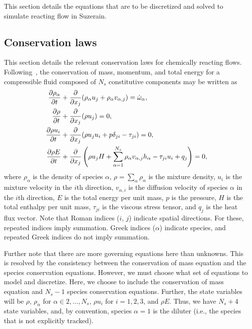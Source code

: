 This section details the equations that are to be discretized and
solved to simulate reacting flow in Suzerain.

\subsection{Conservation laws}
This section details the relevant conservation laws for chemically
reacting flows.  Following~\cite{Anderson_hypersonics,
  Kirk_2009_FINS_model_doc}, the conservation of mass, momentum, and
total energy for a compressible fluid composed of $N_s$ constitutive
components may be written as
%
\begin{align*}
  \frac{\partial \rho_{\alpha}}{\partial t} & + \frac{\partial }{\partial x_j} (\rho_{\alpha} u_j + \rho_{\alpha} v_{\alpha, j}) = \dot{\omega}_{\alpha}, \\
  \frac{\partial \rho}{\partial t} & + \frac{\partial }{\partial x_j} (\rho u_j) = 0, \\
  \frac{\partial \rho u_i}{\partial t} & + \frac{\partial }{\partial x_j} (\rho u_j u_i + p \delta_{ji} - \tau_{ji}) = 0, \\
  \frac{\partial \rho E}{\partial t} & + \frac{\partial }{\partial x_j} \left(\rho u_j H + \sum_{\alpha=1}^{N_s} \rho_{\alpha} v_{\alpha, j} h_{\alpha}  - \tau_{ji} u_i + q_j \right) = 0,\\
\end{align*}
% 
where $\rho_{\alpha}$ is the density of species $\alpha$, $\rho=\sum_{\alpha} \rho_{\alpha}$
is the mixture density, $u_i$ is the mixture velocity in the $i$th
direction, $v_{\alpha, i}$ is the diffusion velocity of species $\alpha$ in the
$i$th direction, $E$ is the total energy per unit mass, $p$ is the
pressure, $H$ is the total enthalpy per unit mass, $\tau_{ji}$ is the
viscous stress tensor, and $q_j$ is the heat flux vector.  Note that
Roman indices ($i$, $j$) indicate spatial directions.  For these,
repeated indices imply summation.  Greek indices ($\alpha$) indicate
species, and repeated Greek indices do not imply summation.

Further note that there are more governing equations here than
unknowns.  This is resolved by the consistency between the
conservation of mass equation and the species conservation equations.
However, we must choose what set of equations to model and discretize.
Here, we choose to include the conservation of mass equation and $N_s
-1$ species conservation equations.  Further, the state variables will
be $\rho$, $\rho_{\alpha}$ for $\alpha \in 2, \ldots, N_s$, $\rho u_i$
for $i = 1, 2, 3$, and $\rho E$.  Thus, we have $N_s + 4$ state
variables, and, by convention, species $\alpha = 1$ is the diluter
(i.e., the species that is not explicitly tracked).

